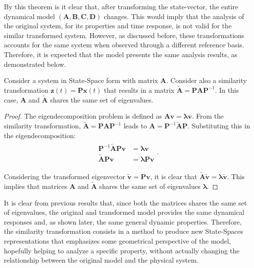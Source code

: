 \documentclass[a4paper,11pt]{book}
\numberwithin{figure}{chapter}
\numberwithin{equation}{chapter}
\numberwithin{table}{chapter}
\newtheorem{theorem}{Theorem}[chapter]
\theoremstyle{definition}
\newcounter{boxed-theorem}
\newenvironment{boxed-theorem}[1]
{\colorlet{shadecolor}{pastelBlue2!5} \begin{shaded} \begin{theorem}{#1}}
{\end{theorem} \end{shaded}}
\newcounter{boxed-lemma}
\newcounter{boxed-definition}
\newcounter{boxed-example}
\begin{document}
By this theorem is it clear that, after transforming the state-vector, the entire dynamical model $(\bm{A}, \bm{B}, \bm{C}, \bm{D})$ changes. This would imply that the analysis of the original system, for its properties and time response, is not valid for the similar transformed system. However, as discussed before, these transformations accounts for the same system when observed through a different reference basis. Therefore, it is expected that the model presents the same analysis results, as demonstrated below.

\begin{boxed-theorem}{} \label{th:simTrans01}
    Consider a system in State-Space form with matrix $\bm{A}$. Consider also a similarity transformation $\bm{z}(t) = \bm{P} \bm{x}(t)$ that results in a matrix $\tilde{\bm{A}} = \bm{P} \bm{A} \bm{P}^{-1}$. In this case, $\bm{A}$ and $\tilde{\bm{A}}$ shares the same set of eigenvalues.
\end{boxed-theorem}

\begin{proof}
    The eigendecomposition problem is defined as $\bm{A} \bm{v} = \bm{\lambda} \bm{v}$. From the similarity transformation, $\tilde{\bm{A}} = \bm{P} \bm{A} \bm{P}^{-1}$ leads to $\bm{A} = \bm{P}^{-1} \tilde{\bm{A}} \bm{P}$. Substituting this in the eigendecomposition:
    \begin{align}
    \begin{split}
        \bm{P}^{-1} \tilde{\bm{A}} \bm{P} \bm{v} & = \bm{\lambda} \bm{v} \\
        \tilde{\bm{A}} \bm{P} \bm{v} & =  \bm{\lambda} \bm{P} \bm{v}
    \end{split}
    .\end{align}
   
    Considering the transformed eigenvector $\tilde{\bm{v}} = \bm{P} \bm{v}$, it is clear that $\tilde{\bm{A}} \tilde{\bm{v}} = \bm{\lambda} \tilde{\bm{v}}$. This implies that matrices $\bm{A}$ and $\tilde{\bm{A}}$ shares the same set of eigenvalues $\bm{\lambda}$.
\end{proof}

It is clear from previous results that, since both the matrices shares the same set of eigenvalues, the original and transformed model provides the same dynamical responses and, as shown later, the same general dynamic properties. Therefore, the similarity transformation consists in a method to produce new State-Spaces representations that emphasizes some geometrical perspective of the model, hopefully helping to analyze a specific property, without actually changing the relationship between the original model and the physical system.
\end{document}
